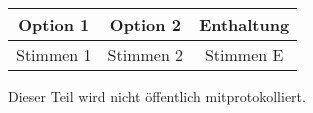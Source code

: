 \documentclass[
    gremium=FSR, %
    ngerman,      %
    wideoverview, %
]{fs-protokoll}
\begin{document}
\begin{center}
\begin{tabular}{c|c|c} 
    \textbf{Option 1} & \textbf{Option 2} & \textbf{Enthaltung}\\ \hline 
     Stimmen 1 & Stimmen 2 & Stimmen E
\end{tabular}
\end{center}

\begin{nichtoeff}
	Dieser Teil wird nicht öffentlich mitprotokolliert.
\end{nichtoeff}


\end{document}
